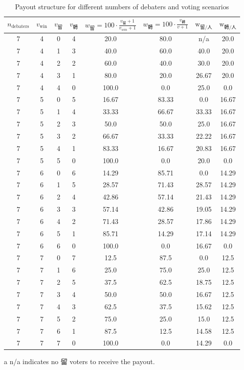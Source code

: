 \documentclass[9pt]{article}
\begin{document}
\begin{table}[h]
    \centering
    \small
    \begin{threeparttable}
    \begin{tabular}{cccccccc}
    \toprule
    $n_{\text{debaters}}$ & $v_{\text{win}}$ & $v_{\text{留}}$ & $v_{\text{轉}}$ & $w_{\text{留}} = 100 \cdot \frac{v_{\text{留}}+1}{v_{win}+1} $ & $w_{\text{轉}} = 100\cdot\frac{v_{\text{轉}}}{v+1}$ & $\text{w}_{\text{留}/\text{人} }$ & $\text{w}_{\text{轉}/\text{人}}$ \\
    \midrule
7 & 4 & 0 & 4 & 20.0 & 80.0 & n/a & 20.0 \\
7 & 4 & 1 & 3 & 40.0 & 60.0 & 40.0 & 20.0 \\
7 & 4 & 2 & 2 & 60.0 & 40.0 & 30.0 & 20.0 \\
7 & 4 & 3 & 1 & 80.0 & 20.0 & 26.67 & 20.0 \\
7 & 4 & 4 & 0 & 100.0 & 0.0 & 25.0 & 0.0 \\
7 & 5 & 0 & 5 & 16.67 & 83.33 & 0.0 & 16.67 \\
7 & 5 & 1 & 4 & 33.33 & 66.67 & 33.33 & 16.67 \\
7 & 5 & 2 & 3 & 50.0 & 50.0 & 25.0 & 16.67 \\
7 & 5 & 3 & 2 & 66.67 & 33.33 & 22.22 & 16.67 \\
7 & 5 & 4 & 1 & 83.33 & 16.67 & 20.83 & 16.67 \\
7 & 5 & 5 & 0 & 100.0 & 0.0 & 20.0 & 0.0 \\
7 & 6 & 0 & 6 & 14.29 & 85.71 & 0.0 & 14.29 \\
7 & 6 & 1 & 5 & 28.57 & 71.43 & 28.57 & 14.29 \\
7 & 6 & 2 & 4 & 42.86 & 57.14 & 21.43 & 14.29 \\
7 & 6 & 3 & 3 & 57.14 & 42.86 & 19.05 & 14.29 \\
7 & 6 & 4 & 2 & 71.43 & 28.57 & 17.86 & 14.29 \\
7 & 6 & 5 & 1 & 85.71 & 14.29 & 17.14 & 14.29 \\
7 & 6 & 6 & 0 & 100.0 & 0.0 & 16.67 & 0.0 \\
7 & 7 & 0 & 7 & 12.5 & 87.5 & 0.0 & 12.5 \\
7 & 7 & 1 & 6 & 25.0 & 75.0 & 25.0 & 12.5 \\
7 & 7 & 2 & 5 & 37.5 & 62.5 & 18.75 & 12.5 \\
7 & 7 & 3 & 4 & 50.0 & 50.0 & 16.67 & 12.5 \\
7 & 7 & 4 & 3 & 62.5 & 37.5 & 15.62 & 12.5 \\
7 & 7 & 5 & 2 & 75.0 & 25.0 & 15.0 & 12.5 \\
7 & 7 & 6 & 1 & 87.5 & 12.5 & 14.58 & 12.5 \\
7 & 7 & 7 & 0 & 100.0 & 0.0 & 14.29 & 0.0 \\
\bottomrule
\end{tabular}
\begin{tablenotes}
    \item[a] n/a indicates no 留 voters to receive the payout.
\end{tablenotes}
\caption{Payout structure for different numbers of debaters and voting scenarios}
\end{threeparttable}
\end{table}
\end{document}
